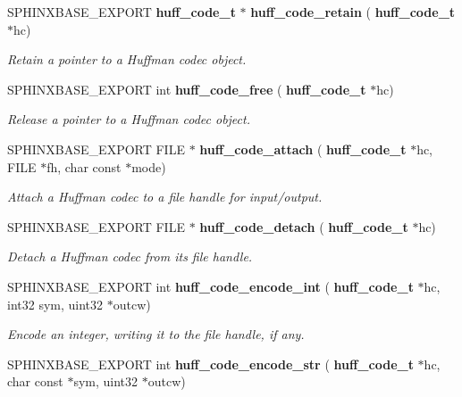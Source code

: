 \begin{DoxyCompactItemize}
\mbox{\label{huff__code_8h_a26a70d1b1704f1af985e67127e622a7b}} 
S\+P\+H\+I\+N\+X\+B\+A\+S\+E\+\_\+\+E\+X\+P\+O\+RT \textbf{ huff\+\_\+code\+\_\+t} $\ast$ \textbf{ huff\+\_\+code\+\_\+retain} (\textbf{ huff\+\_\+code\+\_\+t} $\ast$hc)
\begin{DoxyCompactList}\small\item\em Retain a pointer to a Huffman codec object. \end{DoxyCompactList}\item 
\mbox{\label{huff__code_8h_ac8678d07a65af1963cc0b3bd8b10d646}} 
S\+P\+H\+I\+N\+X\+B\+A\+S\+E\+\_\+\+E\+X\+P\+O\+RT int \textbf{ huff\+\_\+code\+\_\+free} (\textbf{ huff\+\_\+code\+\_\+t} $\ast$hc)
\begin{DoxyCompactList}\small\item\em Release a pointer to a Huffman codec object. \end{DoxyCompactList}\item 
\mbox{\label{huff__code_8h_a9698821197737e3e1be9533a3059c82c}} 
S\+P\+H\+I\+N\+X\+B\+A\+S\+E\+\_\+\+E\+X\+P\+O\+RT F\+I\+LE $\ast$ \textbf{ huff\+\_\+code\+\_\+attach} (\textbf{ huff\+\_\+code\+\_\+t} $\ast$hc, F\+I\+LE $\ast$fh, char const $\ast$mode)
\begin{DoxyCompactList}\small\item\em Attach a Huffman codec to a file handle for input/output. \end{DoxyCompactList}\item 
\mbox{\label{huff__code_8h_a403f575701c1d5fd2ddef1d001cf53e3}} 
S\+P\+H\+I\+N\+X\+B\+A\+S\+E\+\_\+\+E\+X\+P\+O\+RT F\+I\+LE $\ast$ \textbf{ huff\+\_\+code\+\_\+detach} (\textbf{ huff\+\_\+code\+\_\+t} $\ast$hc)
\begin{DoxyCompactList}\small\item\em Detach a Huffman codec from its file handle. \end{DoxyCompactList}\item 
\mbox{\label{huff__code_8h_acf369555b8784eee944f7ebc97b6b825}} 
S\+P\+H\+I\+N\+X\+B\+A\+S\+E\+\_\+\+E\+X\+P\+O\+RT int \textbf{ huff\+\_\+code\+\_\+encode\+\_\+int} (\textbf{ huff\+\_\+code\+\_\+t} $\ast$hc, int32 sym, uint32 $\ast$outcw)
\begin{DoxyCompactList}\small\item\em Encode an integer, writing it to the file handle, if any. \end{DoxyCompactList}\item 
\mbox{\label{huff__code_8h_a24fe76f501a7a0485f3e9485c60fae32}} 
S\+P\+H\+I\+N\+X\+B\+A\+S\+E\+\_\+\+E\+X\+P\+O\+RT int \textbf{ huff\+\_\+code\+\_\+encode\+\_\+str} (\textbf{ huff\+\_\+code\+\_\+t} $\ast$hc, char const $\ast$sym, uint32 $\ast$outcw)

\end{DoxyCompactItemize}

